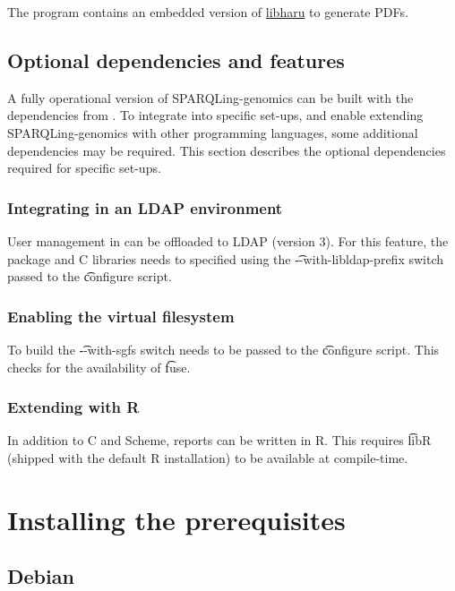  The  program contains an embedded version of
  \href{https://github.com/libharu/libharu}{libharu} to generate PDFs.

\subsection{Optional dependencies and features}

  A fully operational version of SPARQLing-genomics can be built with the
  dependencies from .  To integrate into specific
  set-ups, and enable extending SPARQLing-genomics with other programming
  languages, some additional dependencies may be required.  This section
  describes the optional dependencies required for specific set-ups.

\subsubsection{Integrating  in an LDAP environment}

  User management in  can be offloaded to LDAP (version 3).
  For this feature, the  package and C libraries needs to
  specified using the \t{-{}-with-libldap-prefix} switch passed to the
  \t{configure} script.

\subsubsection{Enabling the virtual filesystem}

  To build  the \t{-{}-with-sgfs} switch needs to be passed to
  the \t{configure} script.  This checks for the availability of \t{fuse}.

\subsubsection{Extending  with R}

  In addition to C and Scheme, reports can be written in R.  This requires
  \t{libR} (shipped with the default R installation) to be available at
  compile-time.

\section{Installing the prerequisites}

\subsection{Debian}

